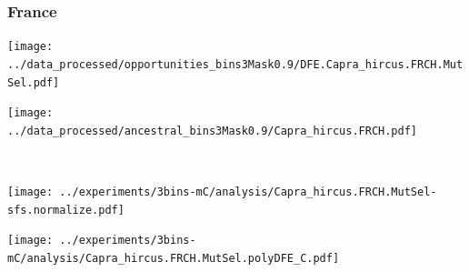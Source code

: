 \subsubsection{France}

\begin{minipage}{0.49\linewidth}
    \texttt{[image: ../data\_processed/opportunities\_bins3Mask0.9/DFE.Capra\_hircus.FRCH.MutSel.pdf]}
\end{minipage}
\begin{minipage}{0.49\linewidth}
    \texttt{[image: ../data\_processed/ancestral\_bins3Mask0.9/Capra\_hircus.FRCH.pdf]}
\end{minipage}
\\
\begin{minipage}{0.49\linewidth}
    \texttt{[image: ../experiments/3bins-mC/analysis/Capra\_hircus.FRCH.MutSel-sfs.normalize.pdf]}
\end{minipage}
\begin{minipage}{0.4\linewidth}
    \texttt{[image: ../experiments/3bins-mC/analysis/Capra\_hircus.FRCH.MutSel.polyDFE\_C.pdf]}
\end{minipage}
